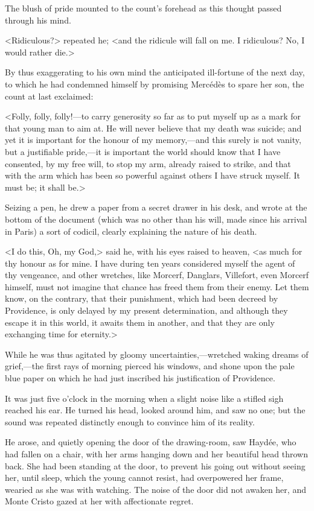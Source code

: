  The blush of pride mounted to the count's forehead as this thought passed through his mind. 

 <Ridiculous?> repeated he; <and the ridicule will fall on me. I ridiculous? No, I would rather die.> 

 By thus exaggerating to his own mind the anticipated ill-fortune of the next day, to which he had condemned himself by promising Mercédès to spare her son, the count at last exclaimed: 

 <Folly, folly, folly!—to carry generosity so far as to put myself up as a mark for that young man to aim at. He will never believe that my death was suicide; and yet it is important for the honour of my memory,—and this surely is not vanity, but a justifiable pride,—it is important the world should know that I have consented, by my free will, to stop my arm, already raised to strike, and that with the arm which has been so powerful against others I have struck myself. It must be; it shall be.> 

 Seizing a pen, he drew a paper from a secret drawer in his desk, and wrote at the bottom of the document (which was no other than his will, made since his arrival in Paris) a sort of codicil, clearly explaining the nature of his death. 

 <I do this, Oh, my God,> said he, with his eyes raised to heaven, <as much for thy honour as for mine. I have during ten years considered myself the agent of thy vengeance, and other wretches, like Morcerf, Danglars, Villefort, even Morcerf himself, must not imagine that chance has freed them from their enemy. Let them know, on the contrary, that their punishment, which had been decreed by Providence, is only delayed by my present determination, and although they escape it in this world, it awaits them in another, and that they are only exchanging time for eternity.> 

 While he was thus agitated by gloomy uncertainties,—wretched waking dreams of grief,—the first rays of morning pierced his windows, and shone upon the pale blue paper on which he had just inscribed his justification of Providence. 

 It was just five o'clock in the morning when a slight noise like a stifled sigh reached his ear. He turned his head, looked around him, and saw no one; but the sound was repeated distinctly enough to convince him of its reality. 

 He arose, and quietly opening the door of the drawing-room, saw Haydée, who had fallen on a chair, with her arms hanging down and her beautiful head thrown back. She had been standing at the door, to prevent his going out without seeing her, until sleep, which the young cannot resist, had overpowered her frame, wearied as she was with watching. The noise of the door did not awaken her, and Monte Cristo gazed at her with affectionate regret. 

